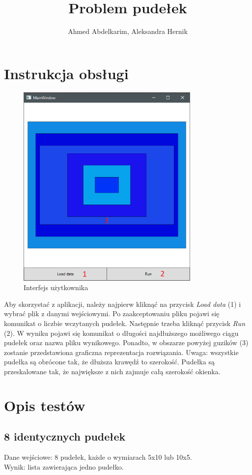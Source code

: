 \documentclass{article}
\title{Problem pudełek}
\author{Ahmed Abdelkarim, Aleksandra Hernik}
\begin{document}
\maketitle

\section{Instrukcja obsługi}
\begin{figure}[H]
\centering
\includegraphics[width=0.8\textwidth]{instrukcja.png}
\caption{Interfejs użytkownika}
\end{figure}
Aby skorzystać z aplikacji, należy najpierw kliknąć na przycisk \textit{Load data} (1) i wybrać plik z danymi wejściowymi. Po zaakceptowaniu pliku pojawi się komunikat o liczbie wczytanych pudełek. Następnie trzeba kliknąć przycisk \textit{Run} (2). W wyniku pojawi się komunikat o długości najdłuższego możliwego ciągu pudełek oraz nazwa pliku wynikowego. Ponadto, w obszarze powyżej guzików (3) zostanie przedstawiona graficzna reprezentacja rozwiązania. Uwaga: wszystkie pudełka są obrócone tak, że dłuższa krawędź to szerokość.  Pudełka są przeskalowane tak, że największe z nich zajmuje całą szerokość okienka.

\section{Opis testów}
\subsection{8 identycznych pudełek}
Dane wejściowe: 8 pudełek, każde o wymiarach 5x10 lub 10x5. \\
Wynik: lista zawierająca jedno pudełko.
\end{document}
